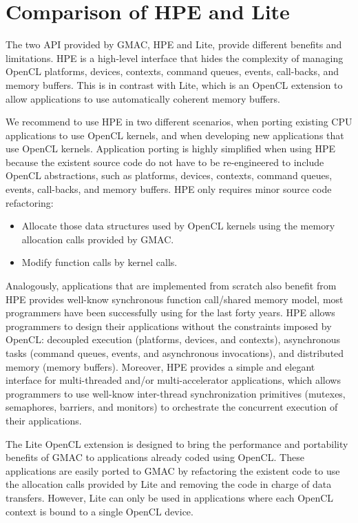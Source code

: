 \section{Comparison of HPE and Lite}
The two API provided by GMAC, HPE and Lite, provide different benefits and limitations. HPE is a 
high\hyp{}level interface that hides the complexity of managing OpenCL platforms, devices, contexts, 
command queues, events, call\hyp{}backs, and memory buffers. This is in contrast with Lite, which is 
an OpenCL extension to allow applications to use automatically coherent memory buffers.

We recommend to use HPE in two different scenarios, when porting existing CPU applications to use 
OpenCL kernels, and when developing new applications that use OpenCL kernels. Application porting is 
highly simplified when using HPE because the existent source code do not have to be 
re\hyp{}engineered to include OpenCL abstractions, such as platforms, devices, contexts, command 
queues, events, call\hyp{}backs, and memory buffers. HPE only requires minor source code 
refactoring:
\begin{itemize}
\item Allocate those data structures used by OpenCL kernels using the memory allocation calls 
provided by GMAC\@.
\item Modify function calls by kernel calls.
\end{itemize}
Analogously, applications that are implemented from scratch also benefit from HPE provides 
well\hyp{}know synchronous function call\slash shared memory model, most programmers have been 
successfully using for the last forty years. HPE allows programmers to design their applications 
without the constraints imposed by OpenCL: decoupled execution (\ie platforms, devices, and 
contexts), asynchronous tasks (\ie command queues, events, and asynchronous invocations), and 
distributed memory (\ie memory buffers). Moreover, HPE provides a simple and elegant interface for 
multi\hyp{}threaded and\slash or multi\hyp{}accelerator applications, which allows programmers to 
use well\hyp{}know inter\hyp{}thread synchronization primitives (\ie mutexes, semaphores, barriers, 
and monitors) to orchestrate the concurrent execution of their applications.

The Lite OpenCL extension is designed to bring the performance and portability benefits of GMAC to 
applications already coded using OpenCL. These applications are easily ported to GMAC by refactoring 
the existent code to use the allocation calls provided by Lite and removing the code in charge of 
data transfers. However, Lite can only be used in applications where each OpenCL context is bound to 
a single OpenCL device.


